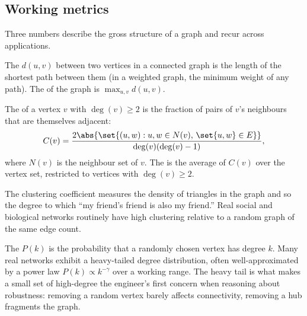 \subsection{Working metrics}

Three numbers describe the gross structure of a graph and recur
across applications.

\begin{definition}[Diameter]
The  $d(u, v)$ between two vertices in a
connected graph is the length of the shortest path between them
(in a weighted graph, the minimum weight of any path). The
 of the graph is $\max_{u, v} d(u, v)$.
\end{definition}

\begin{definition}
The  of a vertex $v$ with
$\deg(v) \geq 2$ is the fraction of pairs of $v$'s neighbours that
are themselves adjacent:
\[
C(v) = \frac{2 \abs{\set{(u, w) : u, w \in N(v),\, \set{u, w} \in
E}}}{\deg(v)(\deg(v) - 1)},
\]
where $N(v)$ is the neighbour set of $v$. The  is the average of $C(v)$ over the vertex
set, restricted to vertices with $\deg(v) \geq 2$.
\end{definition}

The clustering coefficient measures the density of triangles in the
graph and so the degree to which ``my friend's friend is also my
friend.'' Real social and biological networks routinely have high
clustering relative to a random graph of the same edge count.

The  $P(k)$ is the probability that a
randomly chosen vertex has degree $k$. Many real networks exhibit a
heavy-tailed degree distribution, often well-approximated by a
power law $P(k) \propto k^{-\gamma}$ over a working range. The
heavy tail is what makes a small set of high-degree 
the engineer's first concern when reasoning about robustness:
removing a random vertex barely affects connectivity, removing a
hub fragments the graph.

